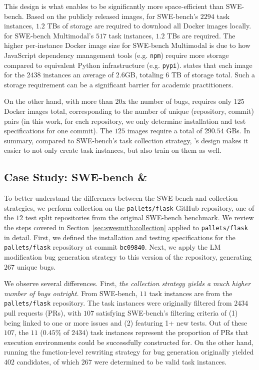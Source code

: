 This design is what enables \bugs{} to be significantly more space-efficient than SWE-bench.
Based on the publicly released images, for SWE-bench's $2294$ task instances, $1.2$ TBs of storage are required to download all Docker images locally.
for SWE-bench Multimodal's $517$ task instances, $1.2$ TBs are required.
The higher per-instance Docker image size for SWE-bench Multimodal is due to how JavaScript dependency management tools (e.g. \texttt{npm}) require more storage compared to equivalent Python infrastructure (e.g. \texttt{pypi}).
\citet{pan_training_2024} states that each image for the $2438$ instances an average of $2.6$GB, totaling 6 TB of storage total.
Such a storage requirement can be a significant barrier for academic practitioners.

On the other hand, with more than $20$x the number of bugs, \bugs{} requires only $125$ Docker images total, corresponding to the number of unique (repository, commit) pairs (in this work, for each repository, we only determine installation and test specifications for one commit).
The $125$ images require a total of $290.54$ GBs.
In summary, compared to SWE-bench's task collection strategy, \bugs{}'s design makes it easier to not only create task instances, but also train on them as well.

\subsection{Case Study: SWE-bench \& \bugs{}}
\label{appx:dataset:case-study}
To better understand the differences between the SWE-bench and \bugs{} collection strategies, we perform \bugs{} collection on the \texttt{pallets/flask} GitHub repository, one of the $12$ test split repositories from the original SWE-bench benchmark.
We review the steps covered in Section~\ref{sec:swesmith:collection} applied to \texttt{pallets/flask} in detail.
First, we defined the installation and testing specifications for the \texttt{pallets/flask} repository at commit \texttt{bc09840}.
Next, we apply the LM modification bug generation strategy to this version of the repository, generating $267$ unique bugs.

We observe several differences.
First, \textit{the \bugs{} collection strategy yields a much higher number of bugs outright.}
From SWE-bench, $11$ task instances are from the \texttt{pallets/flask} repository.
The task instances were originally filtered from $2434$ pull requests (PRs), with $107$ satisfying SWE-bench's filtering criteria of (1) being linked to one or more issues and (2) featuring 1+ new tests.
Out of these $107$, the $11$ ($0.45$\% of $2434$) task instances represent the proportion of PRs that execution environments could be successfully constructed for.
On the other hand, running the function-level rewriting strategy for bug generation originally yielded $402$ candidates, of which $267$ were determined to be valid task instances.

